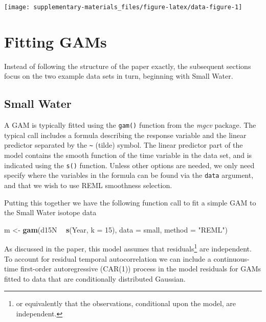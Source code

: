 \documentclass[12pt,]{article}
\newenvironment{Shaded}{\begin{snugshade}}{\end{snugshade}}
\newcommand{\DataTypeTok}[1]{\textcolor[rgb]{0.13,0.29,0.53}{#1}}
\newcommand{\DecValTok}[1]{\textcolor[rgb]{0.00,0.00,0.81}{#1}}
\newcommand{\KeywordTok}[1]{\textcolor[rgb]{0.13,0.29,0.53}{\textbf{#1}}}
\newcommand{\NormalTok}[1]{#1}
\newcommand{\OperatorTok}[1]{\textcolor[rgb]{0.81,0.36,0.00}{\textbf{#1}}}
\newcommand{\StringTok}[1]{\textcolor[rgb]{0.31,0.60,0.02}{#1}}
\begin{document}
\begin{center}\texttt{[image: supplementary-materials\_files/figure-latex/data-figure-1]} \end{center}

\hypertarget{fitting-gams}{%
\section{Fitting GAMs}\label{fitting-gams}}

Instead of following the structure of the paper exactly, the subsequent
sections focus on the two example data sets in turn, beginning with
Small Water.

\hypertarget{small-water}{%
\subsection{Small Water}\label{small-water}}

A GAM is typically fitted using the \texttt{gam()} function from the
\emph{mgcv} package. The typical call includes a formula describing the
response variable and the linear predictor separated by the
\texttt{\textasciitilde{}} (tilde) symbol. The linear predictor part of
the model contains the smooth function of the time variable in the data
set, and is indicated using the \texttt{s()} function. Unless other
options are needed, we only need specify where the variables in the
formula can be found via the \texttt{data} argument, and that we wish to
use REML smoothness selection.

Putting this together we have the following function call to fit a
simple GAM to the Small Water isotope data

\begin{Shaded}
\begin{Highlighting}[]
\NormalTok{m <-}\StringTok{ }\KeywordTok{gam}\NormalTok{(d15N }\OperatorTok{~}\StringTok{ }\KeywordTok{s}\NormalTok{(Year, }\DataTypeTok{k =} \DecValTok{15}\NormalTok{), }\DataTypeTok{data =}\NormalTok{ small, }\DataTypeTok{method =} \StringTok{"REML"}\NormalTok{)}
\end{Highlighting}
\end{Shaded}

As discussed in the paper, this model assumes that residuals\footnote{or
  equivalently that the observations, conditional upon the model, are
  independent.} are independent. To account for residual temporal
autocorrelation we can include a continuous-time first-order
autoregressive (CAR(1)) process in the model residuals for GAMs fitted
to data that are conditionally distributed Gaussian.
\end{document}
